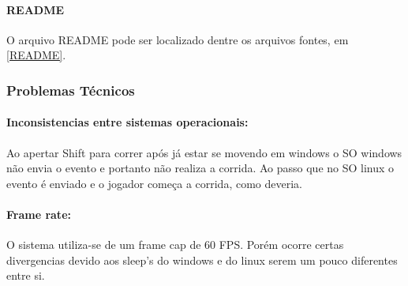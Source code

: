 \paragraph{\textbf{README}}

O arquivo README pode ser localizado dentre os arquivos fontes, em \ref{README}.

\subsubsection{Problemas Técnicos}\label{problens}

\paragraph{\textbf{Inconsistencias entre sistemas operacionais:}}
Ao apertar Shift para correr após já estar se movendo em windows o SO windows 
não envia o evento e portanto não realiza a corrida. Ao passo que no SO linux o evento 
é enviado e o jogador começa a corrida, como deveria.

\paragraph{\textbf{Frame rate:}}
O sistema utiliza-se de um frame cap de 60 FPS. Porém ocorre certas divergencias 
devido aos sleep's do windows e do linux serem um pouco diferentes entre si.



